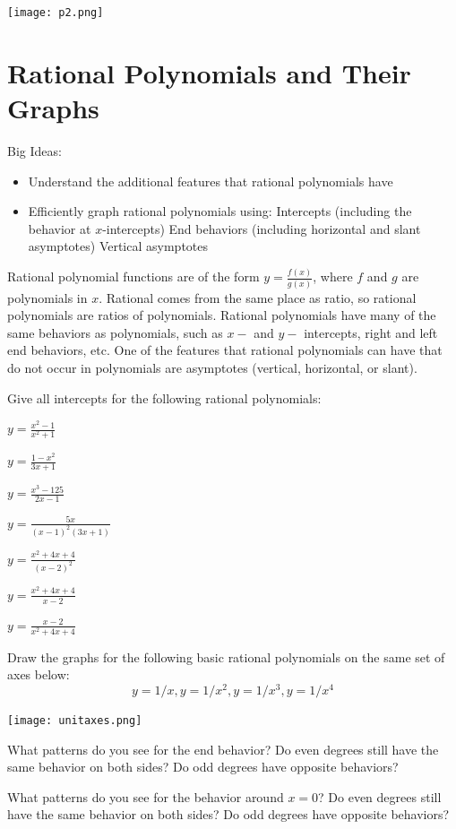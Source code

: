 \begin{center} \texttt{[image: p2.png]} \end{center}
\eq

\section{Rational Polynomials and Their Graphs}
Big Ideas:
\begin{itemize}
\item Understand the additional features that rational polynomials have
\item Efficiently graph rational polynomials using:
\subitem Intercepts (including the behavior at $x$-intercepts)
\subitem End behaviors (including horizontal and slant asymptotes)
\subitem Vertical asymptotes
\end{itemize}
\begin{info} Rational polynomial functions are of the form $y =\frac{f(x)}{g(x)}$, where $f$ and $g$ are polynomials in $x$. Rational comes from the same place as ratio, so rational polynomials are ratios of polynomials. Rational polynomials have many of the same behaviors as polynomials, such as $x-$ and $y-$ intercepts, right and left end behaviors, etc. One of the features that rational polynomials can have that do not occur in polynomials are asymptotes (vertical, horizontal, or slant).\end{info}
\bq Give all intercepts for the following rational polynomials:
\be
\item $y=\frac{x^2-1}{x^2+1}$
\item $y=\frac{1-x^2}{3x+1}$
\item $y=\frac{x^3-125}{2x-1}$
\item $y=\frac{5x}{(x-1)^2(3x+1)}$
\item $y=\frac{x^2+4x+4}{(x-2)^2}$
\item $y=\frac{x^2+4x+4}{x-2}$
\item $y=\frac{x-2}{x^2+4x+4}$
\ee
\eq

\bq Draw the graphs for the following basic rational polynomials on the same set of axes below:
$$ y=1/x, y=1/x^2, y=1/x^3, y=1/x^4$$

\texttt{[image: unitaxes.png]}

\be
\item What patterns do you see for the end behavior? Do even degrees still have the same behavior on both sides? Do odd degrees have opposite behaviors?
\item What patterns do you see for the behavior around $x=0$? Do even degrees still have the same behavior on both sides? Do odd degrees have opposite behaviors?
\ee
\eq

